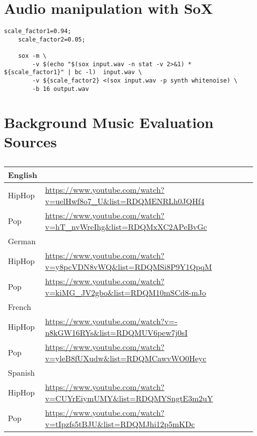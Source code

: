 \begin{appendices}
\section{Audio manipulation with SoX}
\label{sec:appendix_a}

        \begin{lstlisting}[caption=Adding white noise to an audio file]
    scale_factor1=0.94; 
    scale_factor2=0.05;
     
    sox -m \
        -v $(echo "$(sox input.wav -n stat -v 2>&1) * ${scale_factor1}" | bc -l)  input.wav \
        -v ${scale_factor2} <(sox input.wav -p synth whitenoise) \
        -b 16 output.wav
   \end{lstlisting}
   
\section{Background Music Evaluation Sources}

	\begin{table}[h!]
	\centering
	\begin{tabularx}{\textwidth}{ll}
\toprule
English  & \\ \midrule
HipHop  & \url{https://www.youtube.com/watch?v=uelHwf8o7_U&list=RDQMENRLh0JQHf4} \\ 
Pop     & \url{https://www.youtube.com/watch?v=hT_nvWreIhg&list=RDQMxXC2APeBvGc} \\   
\toprule
German  & \\ \midrule
HipHop  & \url{https://www.youtube.com/watch?v=y8pcVDN8vWQ&list=RDQMSi8P9Y1QpqM} \\ 
Pop     & \url{https://www.youtube.com/watch?v=kiMG_JV2gbo&list=RDQM10mSCd8-mJo} \\   
\toprule
French  & \\ \midrule
HipHop  & \url{https://www.youtube.com/watch?v=-n8kGW16RYs&list=RDQMUV6pew7j0sI} \\ 
Pop     & \url{https://www.youtube.com/watch?v=yleB8fUXudw&list=RDQMCawvWO0Heyc} \\   
\toprule
Spanish  & \\ \midrule
HipHop  & \url{https://www.youtube.com/watch?v=CUYrEiymUMY&list=RDQMYSngtE3m2uY} \\ 
Pop     & \url{https://www.youtube.com/watch?v=tIpzfs5tBJU&list=RDQMJhi12p5mKDc} \\   
 	\bottomrule
	\end{tabularx}
	\caption{}
	\label{tab:audio_sources}
	\end{table}

\end{appendices}